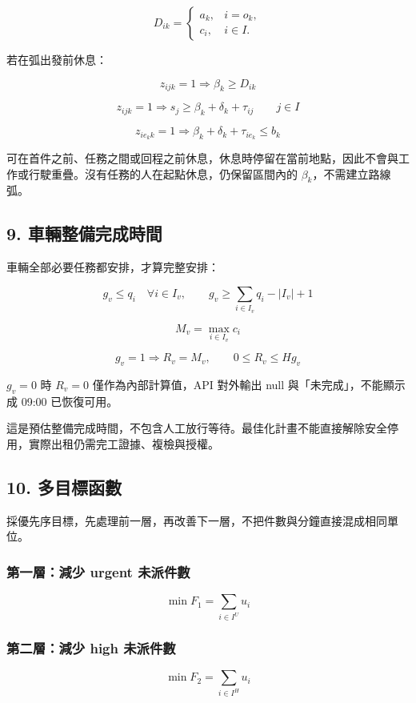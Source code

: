 \documentclass[UTF8,fontset=fandol]{ctexart}
\begin{document}
\[
D_{ik}=\begin{cases}
a_k,&i=o_k,\\
c_i,&i\in I.
\end{cases}
\]

若在弧出發前休息：

\[
z_{ijk}=1\Rightarrow\beta_k\ge D_{ik}
\]

\[
z_{ijk}=1\Rightarrow s_j\ge\beta_k+\delta_k+\tau_{ij}
\qquad j\in I
\]

\[
z_{ie_kk}=1\Rightarrow
\beta_k+\delta_k+\tau_{ie_k}\le b_k
\]

可在首件之前、任務之間或回程之前休息，休息時停留在當前地點，因此不會與工作或行駛重疊。沒有任務的人在起點休息，仍保留區間內的 $\beta_k$，不需建立路線弧。

\subsection*{9. 車輛整備完成時間}

車輛全部必要任務都安排，才算完整安排：

\[
g_v\le q_i\quad\forall i\in I_v,\qquad
g_v\ge\sum_{i\in I_v}q_i-|I_v|+1
\]

\[
M_v=\max_{i\in I_v}c_i
\]

\[
g_v=1\Rightarrow R_v=M_v,\qquad
0\le R_v\le Hg_v
\]

$g_v=0$ 時 $R_v=0$ 僅作為內部計算值，API 對外輸出 null 與「未完成」，不能顯示成 09:00 已恢復可用。

這是預估整備完成時間，不包含人工放行等待。最佳化計畫不能直接解除安全停用，實際出租仍需完工證據、複檢與授權。

\subsection*{10. 多目標函數}

採優先序目標，先處理前一層，再改善下一層，不把件數與分鐘直接混成相同單位。

\subsubsection*{第一層：減少 urgent 未派件數}

\[
\min F_1=\sum_{i\in I^{U}}u_i
\]

\subsubsection*{第二層：減少 high 未派件數}

\[
\min F_2=\sum_{i\in I^{H}}u_i
\]
\end{document}
